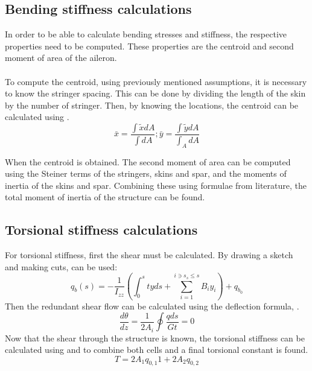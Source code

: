 \subsection{Bending stiffness calculations}
In order to be able to calculate bending stresses and stiffness, the respective properties need to be computed. These properties are the centroid and second moment of area of the aileron. \\ \\
To compute the centroid, using previously mentioned assumptions, it is necessary to know the stringer spacing. This can be done by dividing the length of the skin by the number of stringer. Then, by knowing the locations, the centroid can be calculated using .
\begin{equation}
\label{centroid}
    \bar{x}=\frac{\int \tilde{x} d A}{\int d A} ;  \bar{y}=\frac{\int \tilde{y} d A}{\int_{A} d A}
\end{equation}

\noindent When the centroid is obtained. The second moment of area can be computed using the Steiner terms of the stringers, skins and spar, and the moments of inertia of the skins and spar. Combining these using formulae from literature, the total moment of inertia of the structure can be found.

\subsection{Torsional stiffness calculations}\label{subsec:torsstiffcalc}

For torsional stiffness, first the shear must be calculated. By drawing a sketch and making cuts,  can be used:
\begin{equation}
\label{qb}
    q_{b}(s)=-\frac{1}{I_{z z}}\left(\int_{0}^{s} t y d s+\sum_{i=1}^{i \ni s_{s} \leq s} B_{i} y_{i}\right)+q_{b_{0}}
\end{equation}
\noindent Then the redundant shear flow can be calculated using the deflection formula, . 
\begin{equation}
\label{dtheta}
    \frac{d \theta}{d z}=\frac{1}{2 A_{i}} \oint \frac{q d s}{G t}=0
\end{equation}
Now that the shear through the structure is known, the torsional stiffness can be calculated using  and  to combine both cells and a final torsional constant is found. 
\begin{equation}
\label{T}
    T=2 A_{1} q_{0,1} 1+2 A_{2} q_{0,2}
\end{equation}

